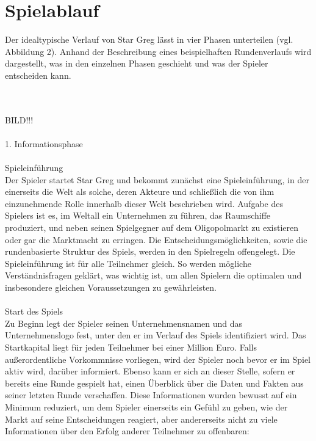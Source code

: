 \section{Spielablauf}
\label{sec:spielwelt-regeln}

Der idealtypische Verlauf von Star Greg lässt in vier Phasen unterteilen (vgl. Abbildung 2). Anhand der Beschreibung eines beispielhaften Rundenverlaufs wird dargestellt, was in den einzelnen Phasen geschieht und was der Spieler entscheiden kann.

\\
\\
BILD!!!
\\
\\

{\Large 1. Informationsphase}
\\
\\
{\large Spieleinführung}
\\
Der Spieler startet Star Greg und bekommt zunächst eine Spieleinführung, in der einerseits die Welt als solche, deren Akteure und schließlich die von ihm einzunehmende Rolle innerhalb dieser Welt beschrieben wird. Aufgabe des Spielers ist es, im Weltall ein Unternehmen zu führen, das Raumschiffe produziert, und neben seinen Spielgegner auf dem Oligopolmarkt zu existieren oder gar die Marktmacht zu erringen. Die Entscheidungsmöglichkeiten, sowie die rundenbasierte Struktur des Spiels, werden in den Spielregeln offengelegt. Die Spieleinführung ist für alle Teilnehmer gleich. So werden mögliche Verständnisfragen geklärt, was wichtig ist, um allen Spielern die optimalen und insbesondere gleichen Voraussetzungen zu gewährleisten. 
\\
\\
{\large Start des Spiels}
\\
Zu Beginn legt der Spieler seinen Unternehmensnamen und das Unternehmenslogo fest, unter den er im Verlauf des Spiels identifiziert wird. Das Startkapital liegt für jeden Teilnehmer bei einer Million Euro. Falls außerordentliche Vorkommnisse vorliegen, wird der Spieler noch bevor er im Spiel aktiv wird, darüber informiert. Ebenso kann er sich an dieser Stelle, sofern er bereits eine Runde gespielt hat, einen Überblick über die Daten und Fakten aus seiner letzten Runde verschaffen. Diese Informationen wurden bewusst auf ein Minimum reduziert, um dem Spieler einerseits ein Gefühl zu geben, wie der Markt auf seine Entscheidungen reagiert, aber andererseits nicht zu viele Informationen über den Erfolg anderer Teilnehmer zu offenbaren:

